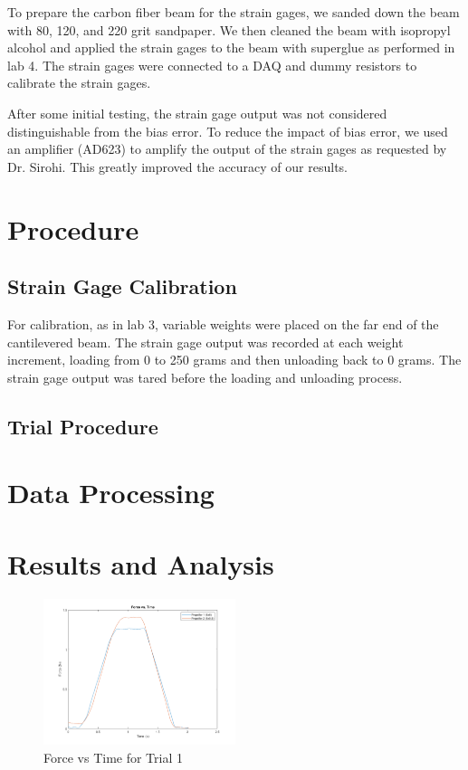 \documentclass{article}
\begin{document}
To prepare the carbon fiber beam for the strain gages, we sanded down the beam with 80, 120, and 220 grit sandpaper. We then cleaned the beam with isopropyl alcohol and applied the strain gages to the beam with superglue as performed in lab 4. The strain gages were connected to a DAQ and dummy resistors to calibrate the strain gages.

After some initial testing, the strain gage output was not considered distinguishable from the bias error. To reduce the impact of bias error, we used an amplifier (AD623) to amplify the output of the strain gages as requested by Dr. Sirohi. This greatly improved the accuracy of our results.  

\section{Procedure}

\subsection{Strain Gage Calibration}

For calibration, as in lab 3, variable weights were placed on the far end of the cantilevered beam. The strain gage output was recorded at each weight increment, loading from 0 to 250 grams and then unloading back to 0 grams. The strain gage output was tared before the loading and unloading process.

\subsection{Trial Procedure}



\section{Data Processing}



\section{Results and Analysis}

\begin{figure}[H]
  \centering
  \includegraphics[width = 0.5\textwidth]{finalprojectimages/Trial1_ForcevTime.png}
  \caption{Force vs Time for Trial 1}
  \label{fig:forcevtime}
\end{figure}
\end{document}
